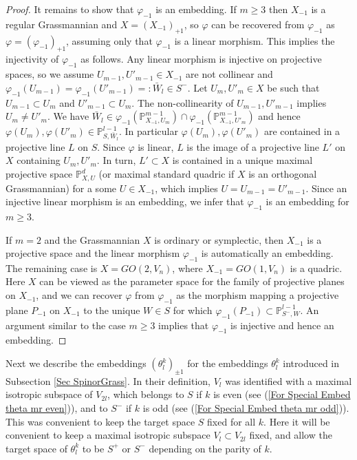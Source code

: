 \documentclass[12pt]{amsart}
\def\PP {{\mathbb P}}     %
\begin{document}
\begin{proof}
It remains to show that $\varphi_{-1}$ is an embedding. If $m\geq 3$ then $X_{-1}$ is a regular Grassmannian and $X=(X_{-1})_{+1}$, so $\varphi$ can be recovered from $\varphi_{-1}$ as $\varphi=(\varphi_{-1})_{+1}$, assuming only that $\varphi_{-1}$ is a linear morphism. This implies the injectivity of $\varphi_{-1}$ as follows. Any linear morphism is injective on projective spaces, so we assume $U_{m-1},U'_{m-1}\in X_{-1}$ are not collinear and $\varphi_{-1}(U_{m-1})=\varphi_{-1}(U'_{m-1})=:\bar W_l\in S^{-}$. Let $U_m,U'_m\in X$ be such that $U_{m-1}\subset U_m$ and $U'_{m-1}\subset U_m$. The non-collinearity of $U_{m-1},U'_{m-1}$ implies $U_m\ne U'_m$. We have $\bar W_l\in \varphi_{-1}(\PP^{m-1}_{X_{-1},U_m})\cap \varphi_{-1}(\PP^{m-1}_{X_{-1},U'_m})$ and hence $\varphi(U_m),\varphi(U'_m)\in \PP^{l-1}_{S,\bar W_l}$. In particular $\varphi(U_m),\varphi(U'_m)$ are contained in a projective line $L$ on $S$. Since $\varphi$ is linear, $L$ is the image of a projective line $L'$ on $X$ containing $U_m,U'_m$. In turn, $L'\subset X$ is contained in a unique maximal projective space $\PP^{d}_{X,U}$ (or maximal standard quadric if $X$ is an orthogonal Grassmannian) for a some $U\in X_{-1}$, which implies $U=U_{m-1}=U'_{m-1}$. Since an injective linear morphism is an embedding, we infer that $\varphi_{-1}$ is an embedding for $m\geq 3$.

If $m=2$ and the Grassmannian $X$ is ordinary or symplectic, then $X_{-1}$ is a projective space and the linear morphism $\varphi_{-1}$ is automatically an embedding. The remaining case is $X=GO(2,V_{n})$, where $X_{-1}=GO(1,V_n)$ is a quadric. Here $X$ can be viewed as the parameter space for the family of projective planes on $X_{-1}$, and we can recover $\varphi$ from $\varphi_{-1}$ as the morphism mapping a projective plane $P_{-1}$ on $X_{-1}$ to the unique $W\in S$ for which $\varphi_{-1}(P_{-1})\subset \PP^{l-1}_{S^{-},W}$. An argument similar to the case $m\geq 3$ implies that $\varphi_{-1}$ is injective and hence an embedding. 
\end{proof}


Next we describe the embeddings $(\theta_l^k)_{\pm1}$ for the embeddings $\theta_l^k$ introduced in Subsection \ref{Sec SpinorGrass}. In their definition, $V_l$ was identified with a maximal isotropic subspace of $V_{2l}$, which belongs to $S$ if $k$ is even (see (\ref{For Special Embed theta mr even})), and to $S^{-}$ if $k$ is odd (see (\ref{For Special Embed theta mr odd})). This was convenient to keep the target space $S$ fixed for all $k$. Here it will be convenient to keep a maximal isotropic subspace $V_l\subset V_{2l}$ fixed, and allow the target space of $\theta_l^k$ to be $S^{+}$ or $S^{-}$ depending on the parity of $k$.
\end{document}
